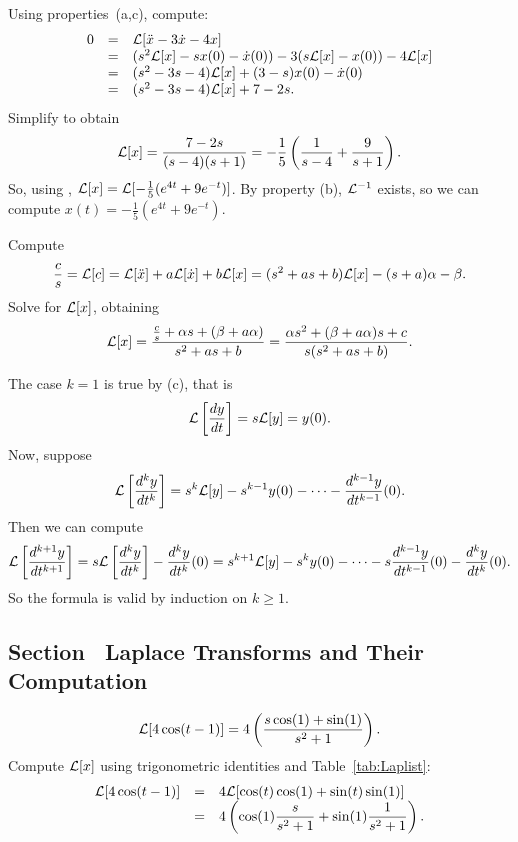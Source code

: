 \soln Using properties~(a,c), compute:
\[
\begin{array}{rcl}
0 & = & {\cal L}[\ddot{x} - 3\dot{x} - 4x] \\
& = & (s^2{\cal L}[x] - sx(0) - \dot{x}(0)) - 3(s{\cal L}[x] - x(0))
- 4{\cal L}[x] \\
& = & (s^2 - 3s - 4){\cal L}[x] + (3 - s)x(0) - \dot{x}(0) \\
& = & (s^2 - 3s - 4){\cal L}[x] + 7 - 2s.
\end{array}
\]
Simplify to obtain
\[
{\cal L}[x] = \frac{7-2s}{(s-4)(s+1)} = 
-\frac{1}{5}\left(\frac{1}{s-4} + \frac{9}{s+1}\right).
\]
So, using ,
${\cal L}[x] = {\cal L}[-\frac{1}{5}(e^{4t}+9e^{-t})]$.  By property 
(b), ${\cal L}^{-1}$ exists, so we can compute 
$x(t) = -\frac{1}{5}(e^{4t}+9e^{-t})$.



 Compute
\[
\frac{c}{s} = {\cal L}[c]
= {\cal L}[\ddot{x}] + a{\cal L}[\dot{x}] + b{\cal L}[x]
= (s^2 + as + b){\cal L}[x] - (s + a)\alpha - \beta.
\]
Solve for ${\cal L}[x]$, obtaining
\[
{\cal L}[x]
= \frac{\frac{c}{s} + \alpha s + (\beta + a\alpha)}{s^2 + as + b}
= \frac{\alpha s^2 + (\beta + a\alpha)s + c}{s(s^2 + as + b)}.
\]


 The case $k = 1$ is true by (c), that is
\[
{\cal L}\left[\frac{dy}{dt}\right] = s{\cal L}[y] = y(0).
\]
Now, suppose
\[
{\cal L}\left[\frac{d^ky}{dt^k}\right] = s^k{\cal L}[y] - s^{k - 1}y(0)
- \cdots - \frac{d^{k - 1}y}{dt^{k - 1}}(0).
\]
Then we can compute
\[
{\cal L}\left[\frac{d^{k + 1}y}{dt^{k + 1}}\right] =
s{\cal L}\left[\frac{d^ky}{dt^k}\right] - \frac{d^ky}{dt^k}(0)
= s^{k + 1}{\cal L}[y] - s^{k}y(0)
- \cdots - s\frac{d^{k - 1}y}{dt^{k - 1}}(0) - \frac{d^ky}{dt^k}(0).
\]
So the formula is valid by induction on $k \geq 1$.



\subsection*{Section~\protect{\ref{S:13.3}} Laplace Transforms and Their Computation}


 \ans
\[
{\cal L}[4\cos(t - 1)] =
4\left(\frac{s\cos(1) + \sin(1)}{s^2 + 1}\right).
\]
\soln Compute ${\cal L}[x]$ using trigonometric identities and
Table~\ref{tab:Laplist}:
\[
\begin{array}{rcl}
{\cal L}[4\cos(t - 1)]
& = & 4{\cal L}[\cos(t)\cos(1) + \sin(t)\sin(1)] \\
& = & \displaystyle 4\left(\cos(1)\frac{s}{s^2 + 1} + \sin(1)\frac{1}{s^2 + 1}\right).
\end{array}
\]

